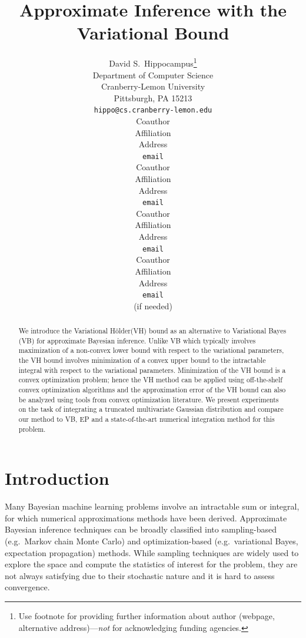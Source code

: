 \documentclass{article} %
\title{Approximate Inference with the Variational \Holder Bound}
\author{
David S.~Hippocampus\thanks{ Use footnote for providing further information
about author (webpage, alternative address)---\emph{not} for acknowledging
funding agencies.} \\
Department of Computer Science\\
Cranberry-Lemon University\\
Pittsburgh, PA 15213 \\
\texttt{hippo@cs.cranberry-lemon.edu} \\
\And
Coauthor \\
Affiliation \\
Address \\
\texttt{email} \\
\AND
Coauthor \\
Affiliation \\
Address \\
\texttt{email} \\
\And
Coauthor \\
Affiliation \\
Address \\
\texttt{email} \\
\And
Coauthor \\
Affiliation \\
Address \\
\texttt{email} \\
(if needed)\\
}
\newcommand{\Holder}{H\"older\xspace}
\newcommand{\red}[1]{{\color{red}#1}}
\begin{document}
\maketitle

\begin{abstract} 
We introduce the Variational \Holder (VH) bound as an alternative to Variational Bayes (VB) for approximate Bayesian inference. Unlike VB which typically involves maximization of a non-convex lower bound with respect to the variational parameters, the VH bound involves minimization of a convex upper bound to the intractable integral with respect to the variational parameters. Minimization of the VH bound is a convex optimization problem; hence the VH method can be applied using off-the-shelf convex optimization algorithms and the approximation error of the VH bound can also be analyzed using tools from convex optimization literature. 
We present experiments on the task of integrating a truncated multivariate Gaussian distribution and compare our method to VB, EP and a state-of-the-art numerical integration method for this problem. 
\end{abstract} 


\section{Introduction}
Many Bayesian machine learning problems involve an intractable sum or integral, for which
numerical approximations methods have been derived. Approximate Bayesian inference techniques can be broadly classified into sampling-based (e.g.~Markov chain Monte Carlo) and optimization-based (e.g.~variational Bayes, expectation propagation) methods.
While sampling techniques
are widely used to explore the space and compute the %
statistics  of
interest for the problem, they are not always satisfying due to their stochastic
nature and it is hard to assess convergence. %
\end{document}
